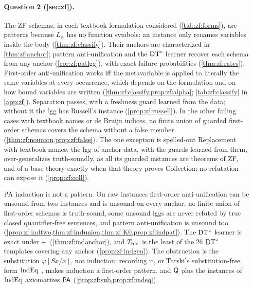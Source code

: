 \paragraph{Question 2 (\cref{sec:zf}).}
The ZF schemas, in each textbook formulation considered (\cref{tab:zf:forms}), are patterns because $L_\in$ has no
function symbols: an instance only renames variables inside the body (\cref{thm:zf:classify}). Their anchors are
characterized in \cref{thm:zf:anchor}; pattern anti-unification \citep{pfenning1991unification,baumgartner2017higher}
and the $\mathrm{DT}^{\circ}$ learner recover each schema from any anchor (\cref{cor:zf:patlgg}), with exact failure probabilities
(\cref{thm:zf:rates}). First-order anti-unification works iff the metavariable is applied to literally the same
variables at every occurrence, which depends on the formulation and on how bound variables are written
(\cref{thm:zf:classify,prop:zf:alpha}; \cref{tab:zf:classify} in \cref{app:zf}). Separation passes, with a freshness
guard learned from the data; without it the lgg has Russell's instance (\cref{prop:zf:russell}). In the other failing
cases with textbook names or de Bruijn indices, no finite union of guarded first-order schemas covers the schema without
a false member (\cref{thm:zf:nounion,prop:zf:false}). The one exception is spelled-out Replacement with textbook names:
the lgg of anchor data, with the guards learned from them, over-generalizes truth-soundly, as all its guarded instances
are theorems of ZF, and of a base theory exactly when that theory proves Collection; no refutation can expose it
(\cref{prop:zf:coll}).

PA induction is not a pattern. On raw instances first-order anti-unification can be unsound from two instances and is
unsound on every anchor, no finite union of first-order schemas is truth-sound, some unsound lggs are never refuted by
true closed quantifier-free sentences, and pattern anti-unification is unsound too
(\cref{prop:zf:indtwo,thm:zf:indunion,thm:zf:K0,prop:zf:indpat}). The $\mathrm{DT}^{\circ}$ learner is exact under \evR+\evN\
(\cref{thm:zf:indanchor}), and $T_{\mathrm{Ind}}$ is the least of the 26 $\mathrm{DT}^{\circ}$ templates covering any anchor
(\cref{prop:zf:indgen}). The obstruction is the substitution $\varphi[Sx/x]$, not induction: recording it, or Tarski's
substitution-free form $\mathrm{IndEq}$ \citep{tarski1965simplified}, makes induction a first-order pattern, and $\mathsf{Q}$ plus the
instances of $\mathrm{IndEq}$ axiomatizes $\mathsf{PA}$ (\cref{prop:zf:sub,prop:zf:indeq}).

